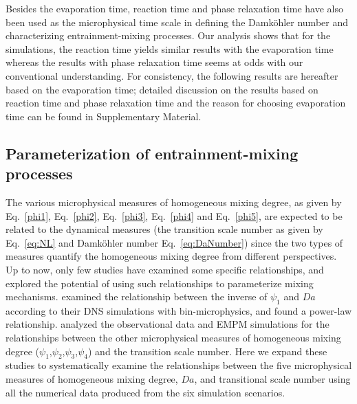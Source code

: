 \documentclass[draft,linenumbers]{agujournal}
\newcommand{\Eq}[1]{Eq.~\eqref{#1}}
\begin{document}
{ Besides the evaporation time, reaction time \citep{Lehmann2009} and phase relaxation time\citep{Kumar12} have also been used as the microphysical time scale in defining the Damk\"{o}hler number and characterizing entrainment-mixing processes.
Our analysis shows that for the simulations, the reaction time yields similar results with the evaporation time whereas the results with phase relaxation time seems at odds with our conventional understanding. For consistency, the following results are hereafter based on the evaporation time; detailed discussion on the results based on reaction time and phase relaxation time and the reason for choosing evaporation time can be found in Supplementary Material.}
 
\subsection{Parameterization of entrainment-mixing processes}
The various microphysical measures of homogeneous mixing degree, as given by \Eq{phi1}, \Eq{phi2}, \Eq{phi3}, \Eq{phi4} and \Eq{phi5}, are expected to be related to the dynamical measures (the transition scale number as given by \Eq{eq:NL} and Damk\"ohler number \Eq{eq:DaNumber}) since the two types of measures quantify the homogeneous mixing degree from different perspectives. Up to now, only few studies have examined some specific relationships, and explored the potential of using such relationships to parameterize mixing mechanisms. \citet{And09} examined the relationship between the inverse of $\psi_1$ and $Da$ according to their DNS simulations with bin-microphysics, and found a power-law relationship. \citet{Lu2013a, Lu2014} analyzed the observational data and EMPM simulations for the relationships between the other microphysical measures of homogeneous mixing degree ($\psi_1$,$\psi_2$,$\psi_3$,$\psi_4$) and the transition scale number. Here we expand these studies to systematically examine the relationships between the five microphysical measures of homogeneous mixing degree, $Da$, and transitional scale number using all the numerical data produced from the six simulation scenarios.
\end{document}
